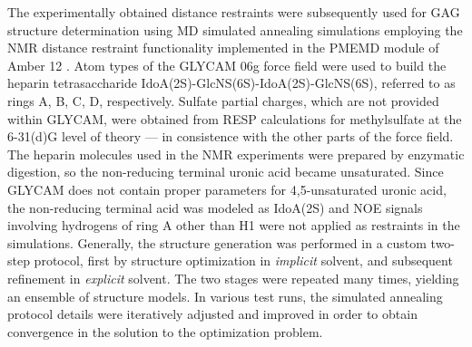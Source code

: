 The experimentally obtained distance restraints were subsequently used for GAG
structure determination using MD simulated annealing simulations employing the
NMR distance restraint functionality implemented in the PMEMD module of Amber 12
\cite{case_amber_12}. Atom types of the GLYCAM 06g force field
\cite{kirschner_glycam06:_2008} were used to build the heparin tetrasaccharide
IdoA(2S)-GlcNS(6S)-IdoA(2S)-GlcNS(6S), referred to as rings A, B, C, D,
respectively. Sulfate partial charges, which are not provided within GLYCAM,
were obtained from RESP calculations for methylsulfate at the 6-31(d)G level of
theory --- in consistence with the other parts of the force field. The heparin
molecules used in the NMR experiments were prepared by enzymatic digestion, so
the non-reducing terminal uronic acid became unsaturated. Since GLYCAM does not
contain proper parameters for 4,5-unsaturated uronic acid, the non-reducing
terminal acid was modeled as IdoA(2S) and NOE signals involving hydrogens of
ring A other than H1 were not applied as restraints in the simulations.
Generally, the structure generation was performed in a custom two-step protocol,
first by structure optimization in \textit{implicit} solvent, and subsequent
refinement in \textit{explicit} solvent. The two stages were repeated many
times, yielding an ensemble of structure models. In various test runs, the
simulated annealing protocol details were iteratively adjusted and improved in
order to obtain convergence in the solution to the optimization problem.

